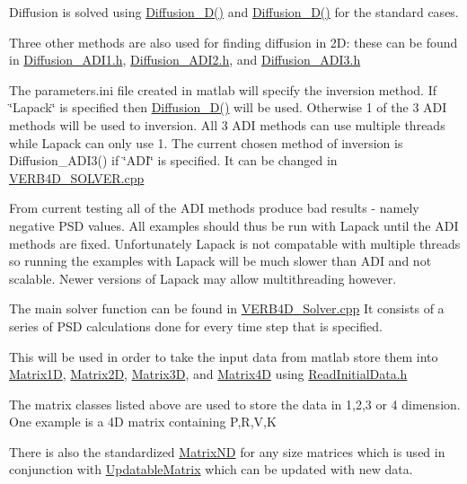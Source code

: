 Diffusion is solved using \hyperlink{_diffusion__1_d_8cpp_ae15e469cb777a21a2dbd751f1c072618}{Diffusion\+\_\+D()} and \hyperlink{_diffusion__2_d_8cpp_ad5785270d5a28bd7a7b8ca31f206c8ee}{Diffusion\+\_\+D()} for the standard cases.

Three other methods are also used for finding diffusion in 2\+D\+: these can be found in \hyperlink{_diffusion___a_d_i1_8h}{Diffusion\+\_\+\+A\+D\+I1.\+h}, \hyperlink{_diffusion___a_d_i2_8h}{Diffusion\+\_\+\+A\+D\+I2.\+h}, and \hyperlink{_diffusion___a_d_i3_8h}{Diffusion\+\_\+\+A\+D\+I3.\+h}

The parameters.\+ini file created in matlab will specify the inversion method. If \char`\"{}\+Lapack\char`\"{} is specified then \hyperlink{_diffusion__2_d_8cpp_ad5785270d5a28bd7a7b8ca31f206c8ee}{Diffusion\+\_\+D()} will be used. Otherwise 1 of the 3 A\+D\+I methods will be used to inversion. All 3 A\+D\+I methods can use multiple threads while Lapack can only use 1. The current chosen method of inversion is Diffusion\+\_\+\+A\+D\+I3() if \char`\"{}\+A\+D\+I\char`\"{} is specified. It can be changed in \hyperlink{_v_e_r_b4_d___solver_8cpp}{V\+E\+R\+B4\+D\+\_\+\+S\+O\+L\+V\+E\+R.\+cpp}

From current testing all of the A\+D\+I methods produce bad results -\/ namely negative P\+S\+D values. All examples should thus be run with Lapack until the A\+D\+I methods are fixed. Unfortunately Lapack is not compatable with multiple threads so running the examples with Lapack will be much slower than A\+D\+I and not scalable. Newer versions of Lapack may allow multithreading however.

The main solver function can be found in \hyperlink{_v_e_r_b4_d___solver_8cpp}{V\+E\+R\+B4\+D\+\_\+\+Solver.\+cpp} It consists of a series of P\+S\+D calculations done for every time step that is specified.

This will be used in order to take the input data from matlab store them into \hyperlink{class_matrix1_d}{Matrix1\+D}, \hyperlink{class_matrix2_d}{Matrix2\+D}, \hyperlink{class_matrix3_d}{Matrix3\+D}, and \hyperlink{class_matrix4_d}{Matrix4\+D} using \hyperlink{_read_initial_data_8h}{Read\+Initial\+Data.\+h}

The matrix classes listed above are used to store the data in 1,2,3 or 4 dimension. One example is a 4\+D matrix containing P,R,V,K

There is also the standardized \hyperlink{class_matrix_n_d}{Matrix\+N\+D} for any size matrices which is used in conjunction with \hyperlink{class_updatable_matrix}{Updatable\+Matrix} which can be updated with new data.

